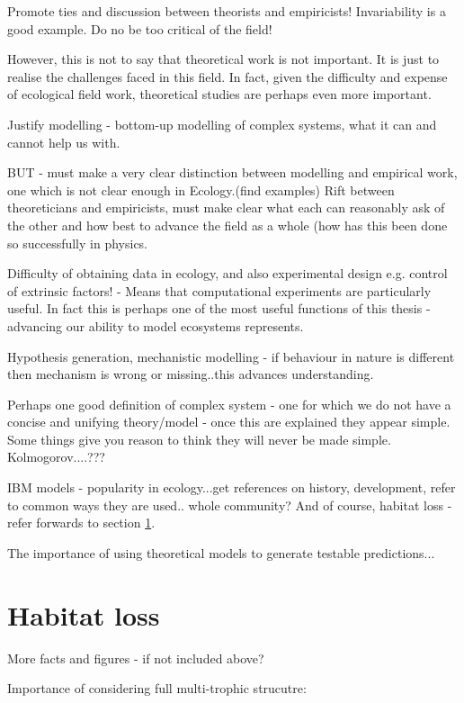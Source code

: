 Promote ties and discussion between theorists and empiricists! Invariability is a good example. Do no be too critical of the field!

However, this is not to say that theoretical work is not important. It is just to realise the challenges faced in this field. In fact, given the difficulty and expense of ecological field work, theoretical studies are perhaps even more important.

Justify modelling - bottom-up modelling of complex systems, what it can and cannot help us with.

BUT - must make a very clear distinction between modelling and empirical work, one which is not clear enough in Ecology.(find examples) Rift between theoreticians and empiricists, must make clear what each can reasonably ask of the other and how best to advance the field as a whole (how has this been done so successfully in physics.

Difficulty of obtaining data in ecology, and also experimental design e.g. control of extrinsic factors! - Means that computational experiments are particularly useful. In fact this is perhaps one of the most useful functions of this thesis - advancing our ability to model ecosystems represents.

Hypothesis generation, mechanistic modelling - if behaviour in nature is different then mechanism is wrong or missing..this advances understanding.

Perhaps one good definition of complex system - one for which we do not have a concise and unifying theory/model - once this are explained they appear simple. Some things give you reason to think they will never be made simple. Kolmogorov....???

IBM models - popularity in ecology...get references on history, development, refer to common ways they are used.. whole community? And of course, habitat loss - refer forwards to section \ref{sec:intro_habitat_loss}. 

The importance of using theoretical models to generate testable predictions...

\section{Habitat loss}
\label{sec:intro_habitat_loss}

More facts and figures - if not included above?

Importance of considering full multi-trophic strucutre: \cite{sole2006ecological}

